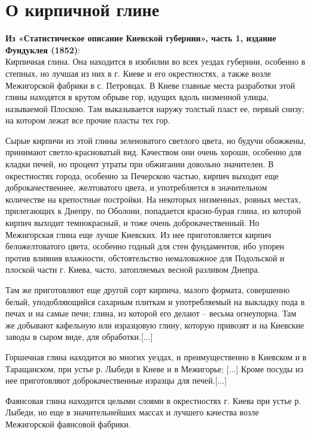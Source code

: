 \chapter*{О кирпичной глине}

\textbf{Из «Статистическое описание Киевской губернии», часть 1, издание Фундуклея (1852)}:\\

Кирпичная глина. Она находится в изобилии во всех уездах губернии, особенно в степных, но лучшая из них в г. Киеве и его окрестностях, а также возле Межигорской фабрики в с. Петровцах. В Киеве главные места разработки этой глины находятся в крутом обрыве гор, идущих вдоль низменной улицы, называемой Плоскою. Там выказывается наружу толстый пласт ее, первый снизу; на котором лежат все прочие пласты тех гор. 

Сырые кирпичи из этой глины зеленоватого светлого цвета, но будучи обожжены, принимают светло-красноватый вид. Качеством они очень хороши, особенно для кладки печей, но процент утраты при обжигании довольно значителен. В окрестностях города, особенно за Печерскою частью, кирпич выходит еще доброкачественнее, желтоватого цвета, и употребляется в значительном количестве на крепостные постройки. На некоторых низменных, ровных местах, прилегающих к Днепру, по Оболони, попадается красно-бурая глина, из которой кирпич выходит темнокрасный, и тоже очень доброкачественный. Но Межигорская глина еще лучше Киевских. Из нее приготовляется кирпич беложелтоватого цвета, особенно годный для стен фундаментов, ибо упорен против влияния влажности, обстоятельство немаловажное для Подольской и плоской части г. Киева, часто, затопляемых весной разливом Днепра.

Там же приготовляют еще другой сорт кирпича, малого формата, совершенно белый, уподобляющийся сахарным плиткам и употребляемый на выкладку пода в печах и на самые печи; глина, из которой его делают – весьма огнеупорна. Там же добывают кафельную или изразцовую глину, которую привозят и на Киевские заводы в сыром виде, для обработки.[...]

Горшечная глина находится во многих уездах, и преимущественно в Киевском и в Таращанском, при устье р. Лыбеди в Киеве и в Межигорье; [...] Кроме посуды из нее приготовляют доброкачественные изразцы для печей.[...]

Фаянсовая глина находится целыми слоями в окрестностях г. Киева при устье р. Лыбеди, но еще в значительнейших массах и лучшего качества возле Межигорской фаянсовой фабрики.\\


